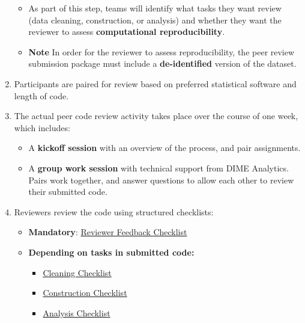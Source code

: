 \documentclass{tufte-handout}
\begin{document}
\begin{fullwidth}
\begin{flushleft}
\begin{enumerate}
        \begin{itemize}
            \item As part of this step, teams will identify what tasks they want review (data cleaning, construction, or analysis) and whether they want the reviewer to assess  \textbf{computational reproducibility}. 
            \item \textbf{Note} In order for the reviewer to assess reproducibility, the peer review submission package must include a \textbf{de-identified} version of the dataset.
        \end{itemize}

        \item Participants are paired for review based on preferred statistical software and length of code.

        \item The actual peer code review activity takes place over the course of one week, which includes:
         \begin{itemize}
            \item A \textbf{kickoff session} with an overview of the process, and pair assignments. 
            \item A \textbf{group work session} with technical support from DIME Analytics. Pairs work together, and answer questions to allow each other to review their submitted code.
        \end{itemize}

       \item Reviewers review the code using structured checklists:
        \begin{itemize}
            \item \textbf{Mandatory}: \href{https://github.com/worldbank/dime-standards/blob/master/dime-coding-standards/checklists/Reviewer%20Feedback%20Checklist.pdf}{Reviewer Feedback Checklist}
            \item \textbf{Depending on tasks in submitted code:} 
            \begin{itemize}
                \item \href{https://github.com/worldbank/dime-standards/blob/master/dime-coding-standards/checklists/Cleaning%20Code%20Review%20Checklist.pdf}{Cleaning Checklist}
                \item \href{https://github.com/worldbank/dime-standards/blob/master/dime-coding-standards/checklists/Construction%20Code%20Review%20Checklist.pdf}{Construction Checklist}
                \item \href{https://github.com/worldbank/dime-standards/blob/master/dime-coding-standards/checklists/Analysis%20Code%20Review%20Checklist.pdf}{Analysis Checklist}
            \end{itemize}
        \end{itemize}


\end{enumerate}
\end{flushleft}
\end{fullwidth}
\end{document}
